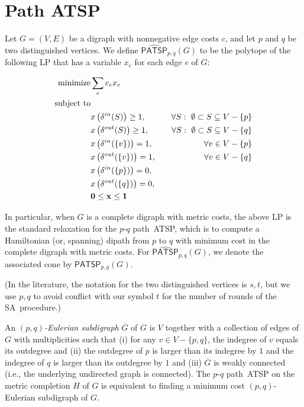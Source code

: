 \documentclass[11pt]{article}
\newcommand{\iSA}{\textsf{SA}}
\newcommand{\xout}[1]{x\left( \delta^{out}(#1)\right)}
\newcommand{\xin}[1]{x\left( \delta^{in}(#1)\right)}
\newcommand{\PATSP}{\textsf{PATSP}}
\newcommand{\PATSPpolytope}{\widehat{\textsf{PATSP}}}
\newcommand\bx {{\bf x}}
\begin{document}
\section{Path ATSP}

Let $G=(V,E)$ be a digraph with nonnegative edge costs $c$, and let $p$
and $q$ be two distinguished vertices. We define
$\PATSPpolytope_{p,q}(G)$ to be the polytope of the following LP that has a variable $x_e$ for each edge $e$ of $G$:


\begin{align}
\textup{minimize} & \sum_{e} c_e x_e & \notag \\
\textup{subject to} && \notag \\
  & \xin{S} \geq 1,& \quad \forall S:~\emptyset \subset S \subseteq V-\{p\} \notag  \\
  & \xout{S} \geq 1,& \quad \forall S:~\emptyset \subset S \subseteq V-\{q\} \notag  \\
  & \xin{\{v\}}  = 1,& \quad \forall v \in V-\{p\} \notag  \\
  & \xout{\{v\}} = 1,& \quad \forall v \in V-\{q\} \notag  \\
  & \xin{\{p\}}  = 0,& \notag  \\
  & \xout{\{q\}}  = 0,& \notag  \\
  & \textbf{0} \leq \bx \leq \textbf{1} & \notag
\end{align}

In particular, when $G$ is a complete digraph with metric costs, the
above LP is the standard relaxation
for the $p$-$q$ path~ATSP, which is to compute a Hamiltonian (or,
spanning) dipath from $p$ to $q$ with minimum cost in the complete
digraph with metric costs. For  $\PATSPpolytope_{p,q}(G)$, we denote the
associated cone by $\PATSP_{p, q}(G)$.

(In the literature, the notation for the two distinguished vertices is
$s,t$, but we use $p,q$ to avoid conflict with our symbol $t$ for the
number of rounds of the \iSA\ procedure.)

An $(p, q)$\textit{-Eulerian subdigraph} $\overline G$ of $G$ is $V$ together
with a collection of edges of $G$ with multiplicities such that (i) for
any $v\in V-\{p, q\}$, the indegree of $v$ equals its outdegree and
(ii) the outdegree of $p$ is larger than its indegree by $1$ and the
indegree of $q$ is larger than its outdegree by $1$ and (iii) $\overline G$
is weakly connected (i.e., the underlying undirected graph is
connected). The $p$-$q$ path~ATSP on the metric completion $H$ of $G$
is equivalent to finding a minimum cost $(p, q)$-Eulerian subdigraph of
$G$.
\end{document}
